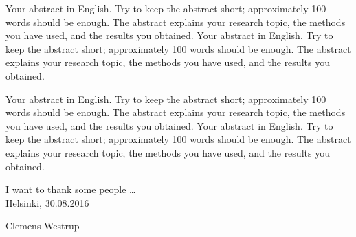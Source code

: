 \begin{abstractpage}[english]
  Your abstract in English. Try to keep the abstract short; approximately
  100 words should be enough. The abstract explains your research topic,
  the methods you have used, and the results you obtained.
  Your abstract in English. Try to keep the abstract short; approximately
  100 words should be enough. The abstract explains your research topic,
  the methods you have used, and the results you obtained.

  Your abstract in English. Try to keep the abstract short; approximately
  100 words should be enough. The abstract explains your research topic,
  the methods you have used, and the results you obtained.
  Your abstract in English. Try to keep the abstract short; approximately
  100 words should be enough. The abstract explains your research topic,
  the methods you have used, and the results you obtained.
\end{abstractpage}

\newpage


I want to thank some people \ldots
\\

\vspace{5cm}
Helsinki, 30.08.2016

\vspace{5mm}
{\hfill Clemens Westrup \hspace{1cm}}

\newpage

\thesistableofcontents



%

